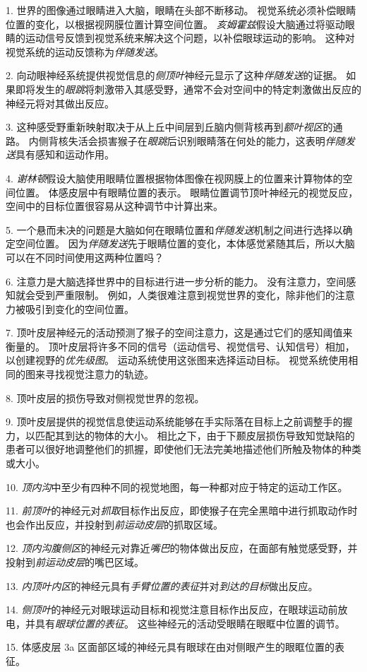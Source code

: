 1. 世界的图像通过眼睛进入大脑，眼睛在头部不断移动。
视觉系统必须补偿眼睛位置的变化，以根据视网膜位置计算空间位置。
\textit{亥姆霍兹}假设大脑通过将驱动眼睛的运动信号反馈到视觉系统来解决这个问题，以补偿眼球运动的影响。
这种对视觉系统的运动反馈称为\textit{伴随发送}。


2. 向动眼神经系统提供视觉信息的\textit{侧顶叶}神经元显示了这种\textit{伴随发送}的证据。
如果即将发生的\textit{眼跳}将刺激带入其感受野，通常不会对空间中的特定刺激做出反应的神经元将对其做出反应。


3. 这种感受野重新映射取决于从上丘中间层到丘脑内侧背核再到\textit{额叶视区}的通路。
内侧背核失活会损害猴子在\textit{眼跳}后识别眼睛落在何处的能力，这表明\textit{伴随发送}具有感知和运动作用。


4. \textit{谢林顿}假设大脑使用眼睛位置根据物体图像在视网膜上的位置来计算物体的空间位置。
体感皮层中有眼睛位置的表示。
眼睛位置调节顶叶神经元的视觉反应，空间中的目标位置很容易从这种调节中计算出来。


5. 一个悬而未决的问题是大脑如何在眼睛位置和\textit{伴随发送}机制之间进行选择以确定空间位置。
因为\textit{伴随发送}先于眼睛位置的变化，本体感觉紧随其后，所以大脑可以在不同时间使用这两种位置吗？


6. 注意力是大脑选择世界中的目标进行进一步分析的能力。
没有注意力，空间感知就会受到严重限制。
例如，人类很难注意到视觉世界的变化，除非他们的注意力被吸引到变化的空间位置。


7. 顶叶皮层神经元的活动预测了猴子的空间注意力，这是通过它们的感知阈值来衡量的。
顶叶皮层将许多不同的信号（运动信号、视觉信号、认知信号）相加，以创建视野的\textit{优先级图}。
运动系统使用这张图来选择运动目标。
视觉系统使用相同的图来寻找视觉注意力的轨迹。


8. 顶叶皮层的损伤导致对侧视觉世界的忽视。


9. 顶叶皮层提供的视觉信息使运动系统能够在手实际落在目标上之前调整手的握力，以匹配其到达的物体的大小。
相比之下，由于下颞皮层损伤导致知觉缺陷的患者可以很好地调整他们的抓握，即使他们无法完美地描述他们所触及物体的种类或大小。


10. \textit{顶内沟}中至少有四种不同的视觉地图，每一种都对应于特定的运动工作区。


11. \textit{前顶叶}的神经元对\textit{抓取}目标作出反应，即使猴子在完全黑暗中进行抓取动作时也会作出反应，并投射到\textit{前运动皮层}的抓取区域。


12. \textit{顶内沟腹侧区}的神经元对靠近\textit{嘴巴}的物体做出反应，在面部有触觉感受野，并投射到\textit{前运动皮层}的嘴巴区域。 


13. \textit{内顶叶内区}的神经元具有\textit{手臂位置的表征}并对\textit{到达的目标}做出反应。


14. \textit{侧顶叶}的神经元对眼球运动目标和视觉注意目标作出反应，在眼球运动前放电，并具有\textit{眼球位置的表征}。
这些神经元的活动受眼睛在眼眶中位置的调节。


15. 体感皮层 3a 区面部区域的神经元具有眼球在由对侧眼产生的眼眶位置的表征。

